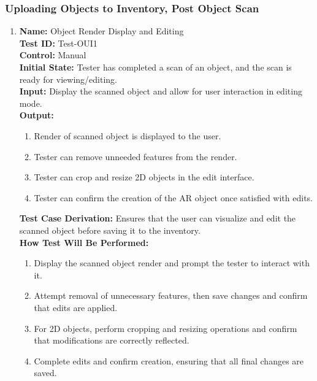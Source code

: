 \documentclass[12pt, titlepage]{article}
\begin{document}
\begin{enumerate}
\end{enumerate}

\subsubsection{Uploading Objects to Inventory, Post Object Scan}

\begin{enumerate}

  \item \textbf{Name:} Object Render Display and Editing \label{itm:Test-OUI1} \\
  \textbf{Test ID:} Test-OUI1 \\
  \textbf{Control:} Manual \\
  \textbf{Initial State:} Tester has completed a scan of an object, and the scan is ready for viewing/editing. \\
  \textbf{Input:} Display the scanned object and allow for user interaction in editing mode. \\
  \textbf{Output:}
  \begin{enumerate}
      \item Render of scanned object is displayed to the user.
      \item Tester can remove unneeded features from the render.
      \item Tester can crop and resize 2D objects in the edit interface.
      \item Tester can confirm the creation of the AR object once satisfied with edits.
  \end{enumerate}
  \textbf{Test Case Derivation:} Ensures that the user can visualize and edit the scanned object before saving it to the inventory. \\
  \textbf{How Test Will Be Performed:}
  \begin{enumerate}
      \item Display the scanned object render and prompt the tester to interact with it.
      \item Attempt removal of unnecessary features, then save changes and confirm that edits are applied.
      \item For 2D objects, perform cropping and resizing operations and confirm that modifications are correctly reflected.
      \item Complete edits and confirm creation, ensuring that all final changes are saved.
  \end{enumerate}


\end{enumerate}
\end{document}
